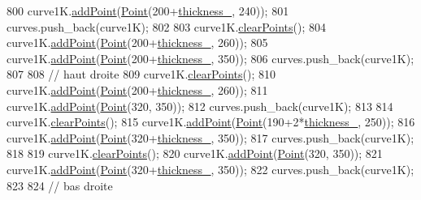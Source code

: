 \begin{DoxyCode}
800     curve1K.\mbox{\hyperlink{class_bezier_curve_a38d16c18b36ae45619b05e26e226cf34}{addPoint}}(\mbox{\hyperlink{class_point}{Point}}(200+\mbox{\hyperlink{class_font_v1_aed8040e76be9a52833627b92f0fb4e5f}{thickness\_}}, 240));
801     curves.push\_back(curve1K);
802 
803     curve1K.\mbox{\hyperlink{class_bezier_curve_a0ba8ce66d5af5971ae6a1b506029728e}{clearPoints}}();
804     curve1K.\mbox{\hyperlink{class_bezier_curve_a38d16c18b36ae45619b05e26e226cf34}{addPoint}}(\mbox{\hyperlink{class_point}{Point}}(200+\mbox{\hyperlink{class_font_v1_aed8040e76be9a52833627b92f0fb4e5f}{thickness\_}}, 260));
805     curve1K.\mbox{\hyperlink{class_bezier_curve_a38d16c18b36ae45619b05e26e226cf34}{addPoint}}(\mbox{\hyperlink{class_point}{Point}}(200+\mbox{\hyperlink{class_font_v1_aed8040e76be9a52833627b92f0fb4e5f}{thickness\_}}, 350));
806     curves.push\_back(curve1K);
807 
808     \textcolor{comment}{// haut droite}
809     curve1K.\mbox{\hyperlink{class_bezier_curve_a0ba8ce66d5af5971ae6a1b506029728e}{clearPoints}}();
810     curve1K.\mbox{\hyperlink{class_bezier_curve_a38d16c18b36ae45619b05e26e226cf34}{addPoint}}(\mbox{\hyperlink{class_point}{Point}}(200+\mbox{\hyperlink{class_font_v1_aed8040e76be9a52833627b92f0fb4e5f}{thickness\_}}, 260));
811     curve1K.\mbox{\hyperlink{class_bezier_curve_a38d16c18b36ae45619b05e26e226cf34}{addPoint}}(\mbox{\hyperlink{class_point}{Point}}(320, 350));
812     curves.push\_back(curve1K);
813 
814     curve1K.\mbox{\hyperlink{class_bezier_curve_a0ba8ce66d5af5971ae6a1b506029728e}{clearPoints}}();
815     curve1K.\mbox{\hyperlink{class_bezier_curve_a38d16c18b36ae45619b05e26e226cf34}{addPoint}}(\mbox{\hyperlink{class_point}{Point}}(190+2*\mbox{\hyperlink{class_font_v1_aed8040e76be9a52833627b92f0fb4e5f}{thickness\_}}, 250));
816     curve1K.\mbox{\hyperlink{class_bezier_curve_a38d16c18b36ae45619b05e26e226cf34}{addPoint}}(\mbox{\hyperlink{class_point}{Point}}(320+\mbox{\hyperlink{class_font_v1_aed8040e76be9a52833627b92f0fb4e5f}{thickness\_}}, 350));
817     curves.push\_back(curve1K);
818 
819     curve1K.\mbox{\hyperlink{class_bezier_curve_a0ba8ce66d5af5971ae6a1b506029728e}{clearPoints}}();
820     curve1K.\mbox{\hyperlink{class_bezier_curve_a38d16c18b36ae45619b05e26e226cf34}{addPoint}}(\mbox{\hyperlink{class_point}{Point}}(320, 350));
821     curve1K.\mbox{\hyperlink{class_bezier_curve_a38d16c18b36ae45619b05e26e226cf34}{addPoint}}(\mbox{\hyperlink{class_point}{Point}}(320+\mbox{\hyperlink{class_font_v1_aed8040e76be9a52833627b92f0fb4e5f}{thickness\_}}, 350));
822     curves.push\_back(curve1K);
823 
824     \textcolor{comment}{// bas droite}

\end{DoxyCode}

